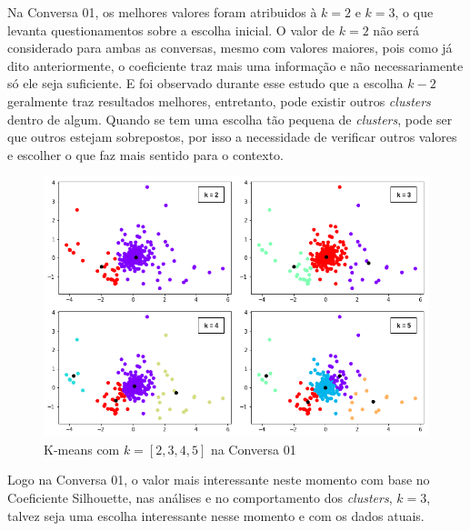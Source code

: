 Na Conversa 01, os melhores valores foram atribuidos à $k=2$ e $k=3$, o que levanta questionamentos sobre a escolha inicial. O valor de $k=2$ não será considerado para ambas as conversas, mesmo com valores maiores, pois como já dito anteriormente, o coeficiente traz mais uma informação e não necessariamente só ele seja suficiente. E foi observado durante esse estudo que a escolha $k-2$ geralmente traz resultados melhores, entretanto, pode existir outros \textit{clusters} dentro de algum. Quando se tem uma escolha tão pequena de \textit{clusters}, pode ser que outros estejam sobrepostos, por isso a necessidade de verificar outros valores e escolher o que faz mais sentido para o contexto.


\begin{figure}[!h]
	\centering
	\includegraphics[keepaspectratio=true,scale=0.58]{figuras/tcc2/compara-k-clusters-conversa-1.png}
	\caption{K-means com $k=[2,3,4,5]$ na Conversa 01}
	\label{fig:compara-cluster-conversa1}
\end{figure}

Logo na Conversa 01, o valor mais interessante neste momento com base no Coeficiente Silhouette, nas análises e no comportamento dos \textit{clusters}, $k=3$, talvez seja uma escolha interessante nesse momento e com os dados atuais.


